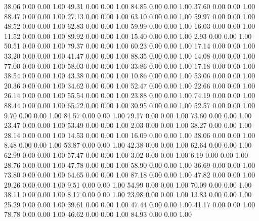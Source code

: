    38.06   0.00   0.00   1.00
   49.31   0.00   0.00   1.00
   84.85   0.00   0.00   1.00
   37.60   0.00   0.00   1.00
   88.47   0.00   0.00   1.00
   27.13   0.00   0.00   1.00
   63.10   0.00   0.00   1.00
   59.97   0.00   0.00   1.00
   48.52   0.00   0.00   1.00
   62.83   0.00   0.00   1.00
   59.99   0.00   0.00   1.00
   16.03   0.00   0.00   1.00
   11.52   0.00   0.00   1.00
   89.92   0.00   0.00   1.00
   15.40   0.00   0.00   1.00
    2.93   0.00   0.00   1.00
   50.51   0.00   0.00   1.00
   79.37   0.00   0.00   1.00
   60.23   0.00   0.00   1.00
   17.14   0.00   0.00   1.00
   33.20   0.00   0.00   1.00
   41.47   0.00   0.00   1.00
   88.35   0.00   0.00   1.00
   14.08   0.00   0.00   1.00
   77.00   0.00   0.00   1.00
   58.03   0.00   0.00   1.00
   33.86   0.00   0.00   1.00
   17.18   0.00   0.00   1.00
   38.54   0.00   0.00   1.00
   43.38   0.00   0.00   1.00
   10.86   0.00   0.00   1.00
   53.06   0.00   0.00   1.00
   20.36   0.00   0.00   1.00
   34.62   0.00   0.00   1.00
   52.47   0.00   0.00   1.00
   22.66   0.00   0.00   1.00
   26.14   0.00   0.00   1.00
   55.54   0.00   0.00   1.00
   23.88   0.00   0.00   1.00
   74.19   0.00   0.00   1.00
   88.44   0.00   0.00   1.00
   65.72   0.00   0.00   1.00
   30.95   0.00   0.00   1.00
   52.57   0.00   0.00   1.00
    9.70   0.00   0.00   1.00
   81.57   0.00   0.00   1.00
   79.17   0.00   0.00   1.00
   73.60   0.00   0.00   1.00
   23.47   0.00   0.00   1.00
   53.49   0.00   0.00   1.00
    2.03   0.00   0.00   1.00
   38.27   0.00   0.00   1.00
   28.14   0.00   0.00   1.00
   14.53   0.00   0.00   1.00
   16.09   0.00   0.00   1.00
   38.06   0.00   0.00   1.00
    8.48   0.00   0.00   1.00
   53.87   0.00   0.00   1.00
   42.38   0.00   0.00   1.00
   62.64   0.00   0.00   1.00
   62.99   0.00   0.00   1.00
   57.47   0.00   0.00   1.00
    3.02   0.00   0.00   1.00
    6.19   0.00   0.00   1.00
   28.76   0.00   0.00   1.00
   47.78   0.00   0.00   1.00
   58.90   0.00   0.00   1.00
   36.69   0.00   0.00   1.00
   73.80   0.00   0.00   1.00
   64.65   0.00   0.00   1.00
   87.18   0.00   0.00   1.00
   47.82   0.00   0.00   1.00
   29.26   0.00   0.00   1.00
    9.51   0.00   0.00   1.00
   54.99   0.00   0.00   1.00
   70.09   0.00   0.00   1.00
   38.11   0.00   0.00   1.00
    8.17   0.00   0.00   1.00
   23.98   0.00   0.00   1.00
   13.83   0.00   0.00   1.00
   25.29   0.00   0.00   1.00
   39.61   0.00   0.00   1.00
   47.44   0.00   0.00   1.00
   41.17   0.00   0.00   1.00
   78.78   0.00   0.00   1.00
   46.62   0.00   0.00   1.00
   84.93   0.00   0.00   1.00
